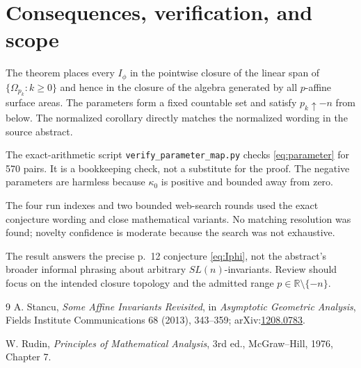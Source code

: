 \documentclass[11pt]{article}
\newcommand{\R}{\mathbb R}
\begin{document}
\section{Consequences, verification, and scope}

The theorem places every $I_\phi$ in the pointwise closure of the linear span
of $\{\Omega_{p_k}:k\geq0\}$ and hence in the closure of the algebra generated
by all $p$-affine surface areas. The parameters form a fixed countable set and
satisfy $p_k\uparrow-n$ from below. The normalized corollary directly matches
the normalized wording in the source abstract.

The exact-arithmetic script \texttt{verify\_parameter\_map.py} checks
\eqref{eq:parameter} for 570 pairs. It is a bookkeeping check, not a substitute
for the proof. The negative parameters are harmless because $\kappa_0$ is
positive and bounded away from zero.

The four run indexes and two bounded web-search rounds used the exact
conjecture wording and close mathematical variants. No matching resolution
was found; novelty confidence is moderate because the search was not exhaustive.

The result answers the precise p.~12 conjecture \eqref{eq:Iphi}, not the
abstract's broader informal phrasing about arbitrary $SL(n)$-invariants.
Review should focus on the intended closure topology and the admitted range
$p\in\R\setminus\{-n\}$.

\begin{thebibliography}{9}
A. Stancu,
\emph{Some Affine Invariants Revisited},
in \emph{Asymptotic Geometric Analysis}, Fields Institute Communications 68
(2013), 343--359;
arXiv:\href{https://arxiv.org/abs/1208.0783}{1208.0783}.

W. Rudin,
\emph{Principles of Mathematical Analysis}, 3rd ed.,
McGraw--Hill, 1976, Chapter 7.
\end{thebibliography}
\end{document}
